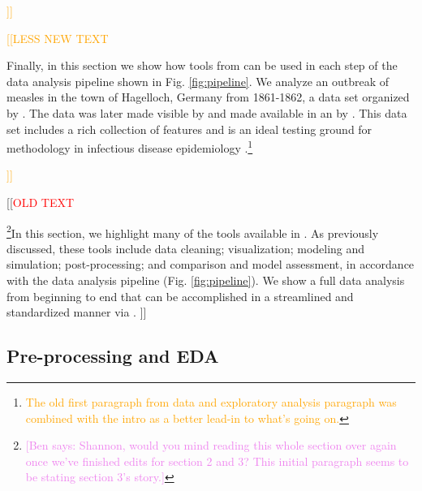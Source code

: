 \documentclass[
  shortnames]{jss}
\begin{document}
\textcolor{orange}{]]}

\textcolor{orange}{[[LESS NEW TEXT}

Finally, in this section we show how tools from  can be
used in each step of the data analysis pipeline shown in Fig.
\ref{fig:pipeline}. We analyze an outbreak of measles in the town of
Hagelloch, Germany from 1861-1862, a data set organized by
\cite{pfeilsticker1863}. The data was later made visible by
\cite{oesterle1992} and made available in an  by
\cite{surveillance2017}. This data set includes a rich collection of
features and is an ideal testing ground for methodology in infectious
disease epidemiology
\cite{Neal2004,britton2011,groendyke2012,becker2016}.\footnote{\textcolor{orange}{The old first paragraph from data and exploratory analysis paragraph was combined with the intro as a better lead-in to what's going on.}}

\textcolor{orange}{]]}

{[}{[}\textcolor{red}{OLD TEXT}

\footnote{\textcolor{violet}{[Ben says: Shannon, would you mind reading this whole section over again once we've finished edits for section 2 and 3? This initial paragraph seems to be stating section 3's story.]}}In
this section, we highlight many of the tools available in
. As previously discussed, these tools include data
cleaning; visualization; modeling and simulation; post-processing; and
comparison and model assessment, in accordance with the data analysis
pipeline (Fig. \ref{fig:pipeline}). We show a full data analysis from
beginning to end that can be accomplished in a streamlined and
standardized manner via . {]}{]}

\subsection{Pre-processing and EDA}
\end{document}
